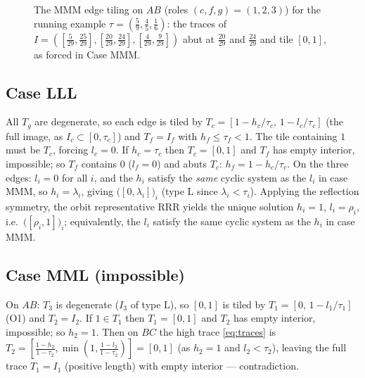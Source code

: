 \documentclass[11pt,reqno]{amsart}
\theoremstyle{plain}
\theoremstyle{definition}
\theoremstyle{remark}
\begin{document}
\begin{figure}[ht]
\centering
{}
\caption{The MMM edge tiling on $AB$ (roles $(c,f,g)=(1,2,3)$) for the running
example $\tau=(\tfrac59,\tfrac45,\tfrac16)$: the traces of
$I=([\tfrac5{29},\tfrac{25}{29}],[\tfrac{20}{29},\tfrac{24}{29}],
[\tfrac4{29},\tfrac9{29}])$ abut at $\tfrac{20}{29}$ and $\tfrac{24}{29}$ and
tile $[0,1]$, as forced in Case MMM.}
\label{fig:tiling}
\end{figure}

\subsection*{Case LLL}
All $T_g$ are degenerate, so each edge is tiled by
$T_c=[1-h_c/\tau_c,\,1-l_c/\tau_c]$ (the full image, as $I_c\subset[0,\tau_c]$)
and $T_f=I_f$ with $h_f\le\tau_f<1$. The tile containing $1$ must be $T_c$,
forcing $l_c=0$. If $h_c=\tau_c$ then $T_c=[0,1]$ and $T_f$ has empty interior,
impossible; so $T_f$ contains $0$ ($l_f=0$) and abuts $T_c$:
$h_f=1-h_c/\tau_c$. On the three edges: $l_i=0$ for all $i$, and the $h_i$
satisfy the \emph{same} cyclic system as the $l_i$ in case MMM, so
$h_i=\lambda_i$, giving $\bigl([0,\lambda_i]\bigr)_i$ (type $\mathrm L$ since
$\lambda_i<\tau_i$). Applying the reflection symmetry, the orbit representative
RRR yields the unique solution $h_i=1$, $l_i=\rho_i$, i.e.\
$\bigl([\rho_i,1]\bigr)_i$; equivalently, the $l_i$ satisfy the same cyclic
system as the $h_i$ in case MMM.

\subsection*{Case MML \textup(impossible\textup)}
On $AB$: $T_3$ is degenerate ($I_3$ of type $\mathrm L$), so $[0,1]$ is tiled
by $T_1=[0,\,1-l_1/\tau_1]$ (O1) and $T_2=I_2$. If $1\in T_1$ then $T_1=[0,1]$
and $T_2$ has empty interior, impossible; so $h_2=1$. Then on $BC$ the high
trace \eqref{eq:traces} is
$T_2=[\tfrac{1-h_2}{1-\tau_2},\min(1,\tfrac{1-l_2}{1-\tau_2})]=[0,1]$ (as
$h_2=1$ and $l_2<\tau_2$), leaving the full trace $T_1=I_1$ (positive length)
with empty interior --- contradiction.
\end{document}
